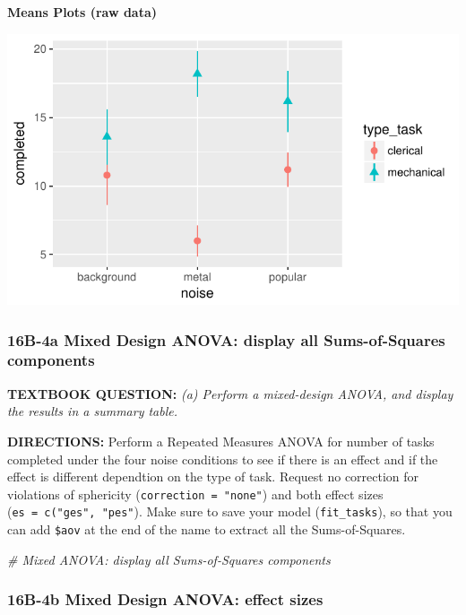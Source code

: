 \documentclass[]{article}
\newenvironment{Shaded}{\begin{snugshade}}{\end{snugshade}}
\newcommand{\CommentTok}[1]{\textcolor[rgb]{0.56,0.35,0.01}{\textit{#1}}}
\begin{document}
\textbf{Means Plots (raw data)}

\begin{center}\includegraphics{Unit_5_assignment_SKELETON_R__spr18__files/figure-latex/unnamed-chunk-53-1} \end{center}

\clearpage

\subsubsection{16B-4a Mixed Design ANOVA: display all Sums-of-Squares
components}\label{b-4a-mixed-design-anova-display-all-sums-of-squares-components}

\textbf{TEXTBOOK QUESTION:} \emph{(a) Perform a mixed-design ANOVA, and
display the results in a summary table.}

\textbf{DIRECTIONS:} Perform a Repeated Measures ANOVA for number of
tasks completed under the four noise conditions to see if there is an
effect and if the effect is different dependtion on the type of task.
Request no correction for violations of sphericity
(\texttt{correction\ =\ "none"}) and both effect sizes
(\texttt{es\ =\ c("ges",\ "pes"}). Make sure to save your model
(\texttt{fit\_tasks}), so that you can add \texttt{\$aov} at the end of
the name to extract all the Sums-of-Squares.

\begin{Shaded}
\begin{Highlighting}[]
\CommentTok{# Mixed ANOVA: display all Sums-of-Squares components}
\end{Highlighting}
\end{Shaded}

\clearpage

\subsubsection{16B-4b Mixed Design ANOVA: effect
sizes}\label{b-4b-mixed-design-anova-effect-sizes}
\end{document}
